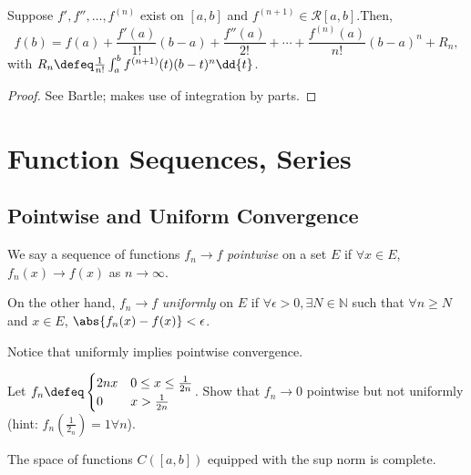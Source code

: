 \begin{theorem}
    Suppose $f', f'', \dots, f^{(n)}$ exist on $[a, b]$ and $f^{(n+1)} \in \mathcal{R}[a, b]$.\footnotemark Then, \[
    f(b) = f(a) + \frac{f'(a)}{1!} (b - a) + \frac{f''(a)}{2!} + \cdots + \frac{f^{(n)}(a)}{n!} (b - a)^n + R_n,
    \]
    with $R_n \defeq \frac{1}{n!} \int_a^b f^{(n+1)}(t) (b-t)^n \dd{t}$.
\end{theorem}
\begin{proof}
    See Bartle; makes use of integration by parts.
\end{proof}


\section{Function Sequences, Series}
\subsection{Pointwise and Uniform Convergence}

\begin{definition}
    We say a sequence of functions $f_n \to f$ \emph{pointwise} on a set $E$ if $\forall x \in E$, $f_n(x) \to f(x)$ as $n \to \infty$.

    On the other hand, $f_n \to f$ \emph{uniformly} on $E$ if $\forall \epsilon > 0, \exists N \in \mathbb{N}$ such that $\forall n \geq N$ and $x \in E$, $\abs{f_n(x) - f(x)} < \epsilon$. 
\end{definition}

\begin{remark}
    Notice that uniformly implies pointwise convergence.
\end{remark}

\begin{example}
    Let $f_n \defeq \begin{cases}
        2n x & 0 \leq x \leq \frac{1}{2n}\\
        0 & x > \frac{1}{2n}
    \end{cases}$. Show that $f_n \to 0$ pointwise but not uniformly (hint: $f_n(\frac{1}{2_n}) = 1 \forall n$).
\end{example}

\begin{theorem}
    The space of functions $C([a, b])$ equipped with the sup norm is complete.
\end{theorem}

